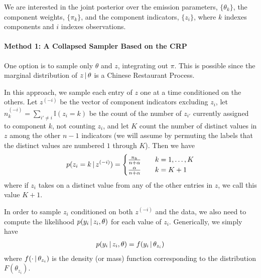   We are interested in the joint posterior over the emission parameters,
  $\{\theta_k\}$, the component weights, $\{\pi_k\}$, and the component
  indicators, $\{z_i\}$, where $k$ indexes components and $i$ indexes
  observations.

  \paragraph{Method 1: A Collapsed Sampler Based on the CRP}
  One option is to sample only $\theta$ and $z$, integrating out
  $\pi$.  This is possible since the marginal distribution of $z
  \, \vert \, \theta$ is a Chinese Restaurant Process.

  In this approach, we sample each entry of $z$ one at a time conditioned on the
  others.  Let $z^{(-i)}$ be the vector of component indicators
  excluding $z_i$, let $n_k^{(-i)} = \sum_{i' \neq i} \mathbb{I}(z_i = k)$ be the count
  of the number of $z_{i'}$ currently assigned to component $k$, not
  counting $z_i$, and let $K$ count the number of distinct values in
  $z$ among the other $n-1$ indicators (we will assume by permuting
  the labels that the distinct values are numbered $1$ through $K$).  Then we have
  \begin{align}
    p(z_i  = k \, \vert \, z^{(-i)}) =
    \begin{cases}
      \frac{n_k}{n + \alpha}& \quad k = 1, \dots, K \\
      \frac{\alpha}{n + \alpha} & \quad k = K + 1
    \end{cases}
  \end{align}
  where if $z_i$ takes on a distinct value from any of the other
  entries in $z$, we call this value $K + 1$.

  In order to sample $z_i$ conditioned on both $z^{(-i)}$ and the
  data, we also need to compute the likelihood $p(y_i \, \vert \, z_i, \theta)$ for
  each value of $z_i$.  Generically, we simply have
  \begin{align}
    p(y_i \, \vert \, z_i, \theta) = f(y_i \, \vert \, \theta_{z_i})
  \end{align}
  where $f(\cdot \, \vert \, \theta_{z_i})$ is the density (or mass)
  function corresponding to the distribution $F(\theta_{z_i})$.

